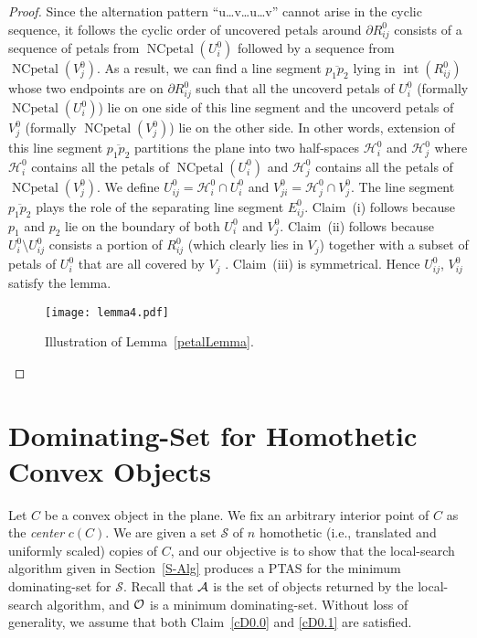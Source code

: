\documentclass[a4paper,11pt]{article}
\DeclareMathOperator{\interior}{int}
\DeclareMathOperator{\NCpetal}{NCpetal}
\begin{document}
\begin{proof}
Since the alternation pattern ``u\dots v\dots u\dots v” cannot arise in the cyclic sequence, it follows the cyclic order of uncovered petals around $\partial R^0_{ij}$ consists of a sequence of petals from $\NCpetal(U^0_i)$ followed by a sequence from $\NCpetal(V^0_j)$. As a result, we can find a line segment  $\overline{p_1p_2}$  lying 
in $\interior(R^0_{ij})$ whose two endpoints are on $\partial R^0_{ij}$ such that all the uncoverd petals of  $U^0_i$ (formally $\NCpetal(U^0_i)$) lie on one side of this line segment and the uncoverd petals of  $V^0_j$ (formally $\NCpetal(V^0_j)$) lie on the other side. 
In other words, extension of this line segment $\overline{p_1p_2}$ partitions the plane into two half-spaces ${\mathcal{H}}^0_i$ and ${\mathcal{H}}^0_j$ where ${\mathcal{H}}^0_i$ contains all the petals of $\NCpetal({U^0_i})$ and ${\mathcal{H}}^0_j$ contains all the petals of $\NCpetal({V^0_j})$. 
We define ${U^0_{ij}}={\mathcal{H}}^0_i\cap {U^0_i}$ and ${V^0_{ji}}={\mathcal{H}}^0_j\cap {V^0_j}$. 
The line segment  $\overline{{p}_1{p}_2}$  plays the role of the separating line segment $E^0_{ij}$. 
Claim~(i) follows because ${p}_1$ and  ${p}_2$ lie on the boundary of both $U_i^0$ and $V_j^0$. Claim~(ii) follows because $U_i^0 \setminus U _{ij}^0$ consists a portion of $R_{ij}^0$ (which clearly lies in $V_j$) together with a subset of petals of $U_i^0$ that are all covered by $V_j$ . Claim~(iii) is symmetrical. Hence ${U^0_{ij}}$, ${V^0_{ij}}$ satisfy the lemma. 
\begin{figure}
  \centering
   \texttt{[image: lemma4.pdf]}
   \caption{Illustration
   of Lemma~\ref{petalLemma}.}
   \label{fig_petalLemma}
\end{figure}
 \end{proof}


\section{Dominating-Set for Homothetic Convex Objects}\label{convPoly}
 
Let $C$ be a convex object in the plane.  We fix an arbitrary interior point of $C$ as 
the   {\it center}  $c(C)$. We are given a 
set $\mathscr{S}$ of $n$ homothetic (i.e., translated and uniformly scaled) copies of $C$, 
and our objective is to show that  the local-search algorithm given in Section~\ref{S-Alg} produces a PTAS for the minimum dominating-set for $\mathscr{S}$. 
Recall that ${\cal A}$  is  the set of objects returned by the  local-search algorithm, and  ${\cal O}$ is a minimum dominating-set. Without loss of generality, we assume that   both Claim~\ref{cD0.0} and \ref{cD0.1} are satisfied.  
\end{document}

